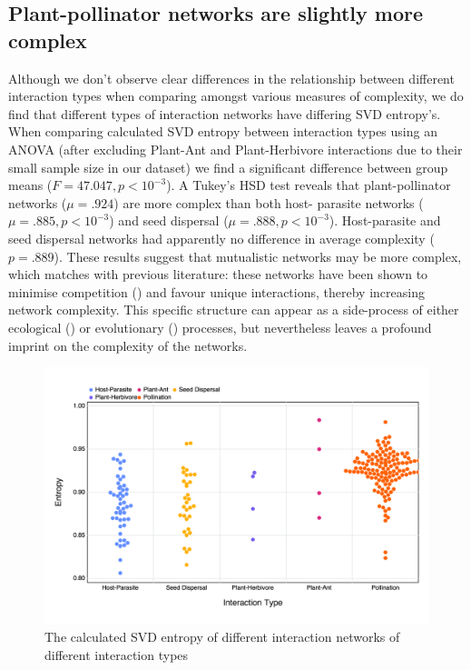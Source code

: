\begin{refsection}
\subsection{Plant-pollinator networks are slightly more
complex}\label{plant-pollinator-networks-are-slightly-more-complex}

Although we don't observe clear differences in the relationship between
different interaction types when comparing amongst various measures of
complexity, we do find that different types of interaction networks have
differing SVD entropy's. When comparing calculated SVD entropy between
interaction types using an ANOVA (after excluding Plant-Ant and Plant-Herbivore
interactions due to their small sample size in our dataset) we find a
significant difference between group means (\(F = 47.047, p < 10^{-3}\)). A
Tukey's HSD test reveals that plant-pollinator networks (\(\mu = .924\)) are
more complex than both host- parasite networks (\(\mu = .885, p < 10^{-3}\)) and
seed dispersal (\(\mu = .888, p < 10^{-3}\)). Host-parasite and seed dispersal
networks had apparently no difference in average complexity (\(p = .889\)).
These results suggest that mutualistic networks may be more complex, which
matches with previous literature: these networks have been shown to minimise
competition (\cite{Bastolla2009ArcMut}) and favour unique interactions, thereby
increasing network complexity. This specific structure can appear as a
side-process of either ecological (\cite{Maynard2018NetSpa}) or evolutionary
(\cite{Valverde2018ArcMut}) processes, but nevertheless leaves a profound imprint
on the complexity of the networks.

\begin{figure}[h]
    \centering
    \includegraphics[width=\textwidth]{figures/interactiontype_v_entropy.png}
    \caption{The calculated SVD entropy of different interaction networks of
different interaction types}
    \label{fig:type}
\end{figure}


\end{refsection}
